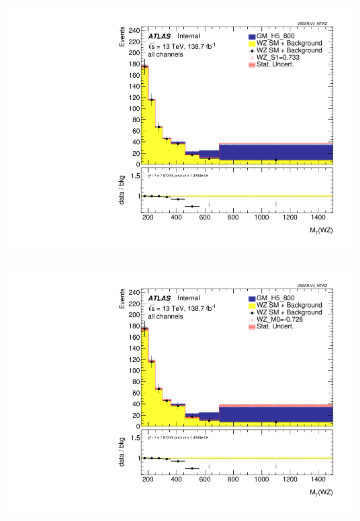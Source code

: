\documentclass[../Bachelorarbeit.tex]{subfiles}
\begin{document}
\begin{figure}

    \centering
    \begin{subfigure}{0.3\textwidth}
        \includegraphics[width=\textwidth]{Plots/ALL_MTWZ_final/GM_H5_800/S1/2022-04-21/VBSSR/all_VV_MTWZ.pdf}
    \end{subfigure}
    \begin{subfigure}{0.3\textwidth}
        \includegraphics[width=\textwidth]{Plots/ALL_MTWZ_final/GM_H5_800/M0/2022-04-21/VBSSR/all_VV_MTWZ.pdf}
    \end{subfigure}
    \begin{subfigure}{0.3\textwidth}

\end{subfigure}
\end{figure}
\end{document}
